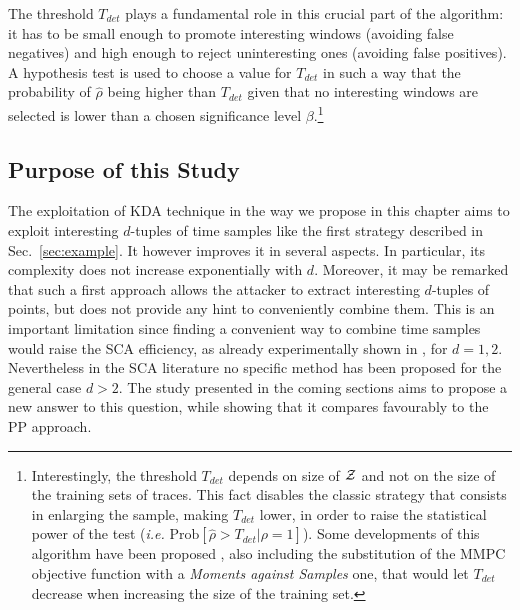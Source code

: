 The threshold $T_{det}$ plays a fundamental role in this crucial part of the algorithm: it has to be small enough to promote interesting windows (avoiding false negatives) and high enough to reject uninteresting ones (avoiding false positives). A hypothesis test is used to choose a value for $T_{det}$ in such a way that the probability of $\hat{\rho}$ being higher than $T_{det}$ given that no interesting windows are selected is lower than a chosen significance level $\beta$.\footnote{Interestingly, the threshold $T_{det}$ depends on size of $\mathcal{Z}$ and not on the size of the training sets of traces. This fact disables the classic strategy that consists in enlarging the sample, making $T_{det}$ lower, in order to raise the statistical power of the test (\emph{i.e.} $\mathrm{Prob}[\hat{\rho}>T_{det}\vert \rho=1]$). Some developments of this algorithm have been proposed \cite{durvauximproved}, also including the substitution of the MMPC objective function with a \emph{Moments against Samples} one, that would let $T_{det}$ decrease when increasing the size of the training set.} \\

\subsection{Purpose of this Study}

The exploitation of KDA technique in the way we propose in this chapter aims to exploit interesting $d$-tuples of time samples like the first strategy described in Sec.~\ref{sec:example}. It however improves it in several aspects. In particular, its complexity does not increase exponentially with $d$. Moreover, it may be remarked that such a first approach allows the attacker to extract interesting $d$-tuples of points, but does not provide any hint to conveniently combine them. This is an important limitation since  finding a convenient way to combine time samples would raise the SCA efficiency, as already experimentally shown in \cite{boosting}, for $d = 1,2$. Nevertheless in the SCA literature no specific method has been proposed for the general case $d>2$.  The study presented in the coming sections aims to propose a new answer to this question, while showing that it compares favourably to the PP approach.

